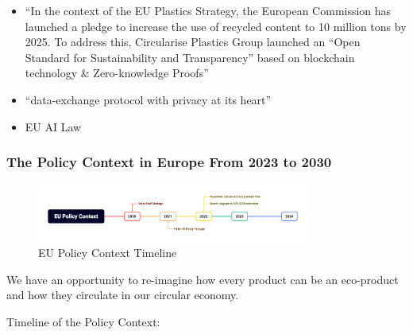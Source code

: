 \documentclass[
  letterpaper,
  DIV=11,
  numbers=noendperiod]{scrartcl}
\begin{document}
\begin{itemize}
\item
  ``In the context of the EU Plastics Strategy, the European Commission
  has launched a pledge to increase the use of recycled content to 10
  million tons by 2025. To address this, Circularise Plastics Group
  launched an ``Open Standard for Sustainability and Transparency''
  based on blockchain technology \& Zero-knowledge Proofs''
  \citet{circulariseEuPCCircularisePlastics2020}
\item
  ``data-exchange protocol with privacy at its heart''
  \citet{circulariseCirculariseRaisesMillion2020}
\item
  EU AI Law \citet{lomasDealEUAI2024}
\end{itemize}

\subsubsection{The Policy Context in Europe From 2023 to
2030}\label{the-policy-context-in-europe-from-2023-to-2030}

\begin{figure}[H]

{\centering \includegraphics[width=0.8\textwidth,height=\textheight]{./images/eu-policy-context.png}

}

\caption{EU Policy Context Timeline}

\end{figure}%

We have an opportunity to re-imagine how every product can be an
eco-product and how they circulate in our circular economy.

Timeline of the Policy Context:
\end{document}
